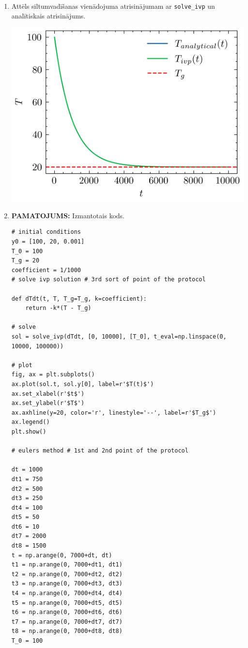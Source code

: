 \documentclass[12pt]{article}
\begin{document}
\begin{enumerate}
  \item Attēls siltumvadīšanas vienādojuma atrisinājumam ar
        \texttt{solve\_ivp} un analītiskais atrisinājums.

\begin{center}
    \includegraphics[]{1.3.png}
\end{center}
        
  \item \textbf{PAMATOJUMS:} Izmantotais kods.

\begin{verbatim}
# initial conditions
y0 = [100, 20, 0.001]
T_0 = 100
T_g = 20
coefficient = 1/1000
# solve ivp solution # 3rd sort of point of the protocol
 
def dTdt(t, T, T_g=T_g, k=coefficient):
    return -k*(T - T_g)

# solve
sol = solve_ivp(dTdt, [0, 10000], [T_0], t_eval=np.linspace(0, 10000, 100000))

# plot
fig, ax = plt.subplots()
ax.plot(sol.t, sol.y[0], label=r'$T(t)$')
ax.set_xlabel(r'$t$')
ax.set_ylabel(r'$T$')
ax.axhline(y=20, color='r', linestyle='--', label=r'$T_g$')
ax.legend()
plt.show()

# eulers method # 1st and 2nd point of the protocol
 
dt = 1000
dt1 = 750
dt2 = 500
dt3 = 250
dt4 = 100
dt5 = 50
dt6 = 10
dt7 = 2000
dt8 = 1500
t = np.arange(0, 7000+dt, dt)
t1 = np.arange(0, 7000+dt1, dt1)
t2 = np.arange(0, 7000+dt2, dt2)
t3 = np.arange(0, 7000+dt3, dt3)
t4 = np.arange(0, 7000+dt4, dt4)
t5 = np.arange(0, 7000+dt5, dt5)
t6 = np.arange(0, 7000+dt6, dt6)
t7 = np.arange(0, 7000+dt7, dt7)
t8 = np.arange(0, 7000+dt8, dt8)
T_0 = 100


\end{verbatim}
\end{enumerate}
\end{document}
